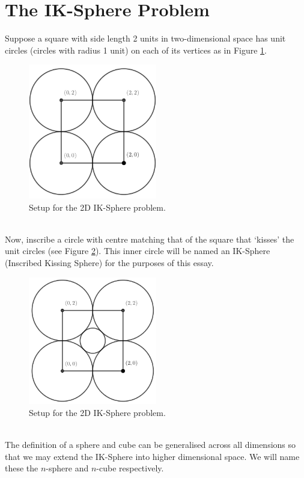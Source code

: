 \section{The IK-Sphere Problem}
Suppose a square with side length 2 units in two-dimensional space has unit circles (circles with radius 1 unit) on each of its vertices as in Figure \ref{fig:2d_Setup_IK_Sphere}.
\begin{figure}[h]
    \centering
    \includegraphics[width=0.5\textwidth]{images/2D.png}
    \caption{\label{fig:2d_Setup_IK_Sphere}Setup for the 2D IK-Sphere problem.}
\end{figure}
\\Now, inscribe a circle with centre matching that of the square that `kisses' the unit circles (see Figure \ref{fig:2d_IK_Sphere}). This inner circle will be named an IK-Sphere (Inscribed Kissing Sphere) for the purposes of this essay.
\begin{figure}[h]
    \centering
    \includegraphics[width=0.5\textwidth]{images/2D IK.png}
    \caption{\label{fig:2d_IK_Sphere}Setup for the 2D IK-Sphere problem.}
\end{figure}
\\The definition of a sphere and cube can be generalised across all dimensions so that we may extend the IK-Sphere into higher dimensional space. We will name these the $n$-sphere and $n$-cube respectively.

